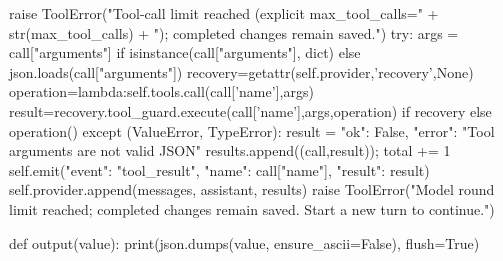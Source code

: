                     raise ToolError("Tool-call limit reached (explicit max_tool_calls=" + str(max_tool_calls) + "); completed changes remain saved.")
                try:
                    args = call["arguments"] if isinstance(call["arguments"], dict) else json.loads(call["arguments"])
                    recovery=getattr(self.provider,'recovery',None)
                    operation=lambda:self.tools.call(call['name'],args)
                    result=recovery.tool_guard.execute(call['name'],args,operation) if recovery else operation()
                except (ValueError, TypeError):
                    result = {"ok": False, "error": "Tool arguments are not valid JSON"}
                results.append((call,result)); total += 1
                self.emit({"event": "tool_result", "name": call["name"], "result": result})
            self.provider.append(messages, assistant, results)
        raise ToolError("Model round limit reached; completed changes remain saved. Start a new turn to continue.")

def output(value):
    print(json.dumps(value, ensure_ascii=False), flush=True)

